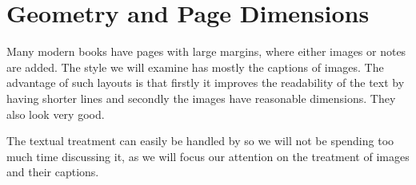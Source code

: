 \def\ps@caption{%
     \let\@oddfoot\@empty\let\@evenfoot\@empty%
     \edef\leftx{-\marginparwidth-\marginparsep}
    \def\@evenhead{%
           \begin{picture}(0,0)%
           \put(-\marginparwidth-\marginparsep,-\headheight-\topsep-5pt){ \line(1, 0){\marginparwidth}}%
           \put(-\marginparwidth-\marginparsep,-\headheight-\headsep){ \line(1, 0){\marginparwidth}}%
            \put(\leftx,-90){\asidecaption\par}%
            \stepcounter{figure}%
           \put(\leftx,-370){\asidecaption}%
        \end{picture}%
      }%
    \let\@oddhead\@evenhead%
    \let\@mkboth\@gobbletwo%
    \let\chaptermark\@gobble%
    \let\sectionmark\@gobble%
 }

\def\ps@bigpicture{%
    \setlength\headheight{19cm}%
    \let\@oddfoot\@empty\let\@evenfoot\@empty%
    \def\@evenhead{%
         \begin{picture}(0,0)%
          \put(-149,0){\texttt{[image: stuartpearson]}}%
         \end{picture}%
      }%
    \let\@oddhead\@evenhead%
    \let\@mkboth\@gobbletwo%
    \let\chaptermark\@gobble%
    \let\sectionmark\@gobble%
 }


\def\doubletakeimage{%
  \renewcommand{\topfraction}{.95}%
  \begin{figure}[t]
      \texttt{[image: matron]}%
       \thispagestyle{caption}
  \end{figure}

  \begin{figure}[tp]
   \hspace*{-\marginparwidth}\texttt{[image: stuartpearson]}
 \end{figure}
}



\chapter{Geometry and Page Dimensions}

Many modern books have pages with large margins, where either images or notes are added. The style we will
examine has mostly the captions of images. The advantage of such layouts is that firstly it improves the readability of the text by having shorter lines and secondly the images have reasonable dimensions. They also look very
good.

The textual treatment can easily be handled by \latexe so we will not be spending too much time discussing it, as 
we will focus our attention on the treatment of images and their captions.

